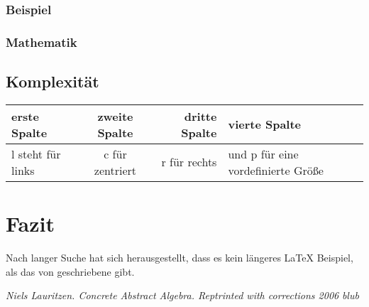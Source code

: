 \documentclass[12pt, a4paper, titlepage,twoside]{article}
\begin{document}
			\subsubsection{Beispiel}
			\subsubsection{Mathematik}
		\subsection{Komplexit\"at}
	
	\begin{tabular}{|l|c|r|p{2cm}|}
		\hline
		erste Spalte & zweite Spalte & dritte Spalte & vierte Spalte \\
		\hline 
		l steht f\"ur links & c f\"ur zentriert & r f\"ur rechts & und p f\"ur 
		eine vordefinierte Gr\"o\ss e \\
		\hline 
	\end{tabular} 
	
	
	\newpage
	\section{Fazit}\label{conclusions}
	Nach langer Suche hat sich herausgestellt, dass es kein l\"angeres
	\LaTeX{} Beispiel, als das von \cite{lau} geschriebene gibt.
	
	
	\newpage
	\begin{thebibliography}{2}
		 \emph{Niels Lauritzen. Concrete Abstract Algebra. Reptrinted with
			corrections 2006}
		 \emph{blub}
	\end{thebibliography}
	
\end{document}
